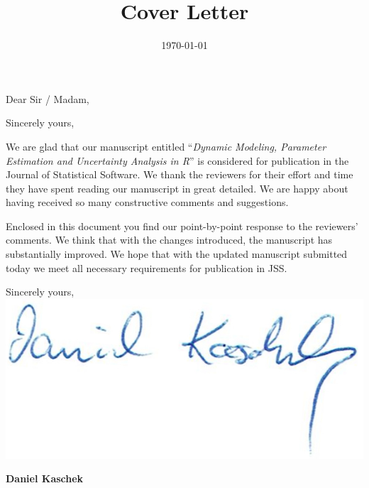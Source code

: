 \documentclass[11pt,a4paper,sans]{moderncv} %
\title{Cover Letter}
\begin{document}


\clearpage

\date{\today} %
\opening{Dear Sir / Madam,} %
\closing{Sincerely yours,} %

\makelettertitle %

We are glad that our manuscript entitled ``\textit{Dynamic Modeling, Parameter Estimation and Uncertainty Analysis in R}'' is considered for publication in the Journal of Statistical Software. We thank the reviewers for their effort and time they have spent reading our manuscript in great detailed. We are happy about having received so many constructive comments and suggestions.

Enclosed in this document you find our point-by-point response to the reviewers' comments. We think that with the changes introduced, the manuscript has substantially improved. We hope that with the updated manuscript submitted today we meet all necessary requirements for publication in JSS. 

\vspace{2em}
Sincerely yours,\\
\vspace{2em}
\includegraphics{signature}

\vspace{-3em}
\textbf{Daniel Kaschek}
\end{document}

